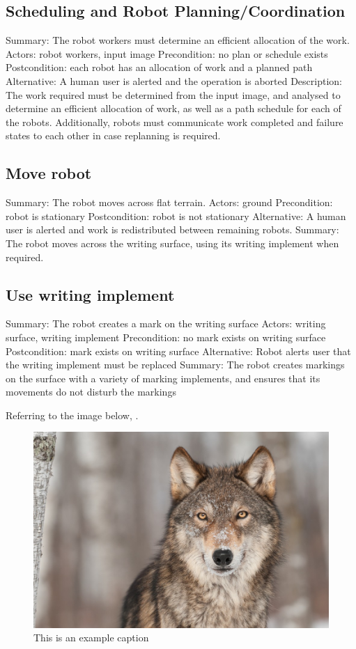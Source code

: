 \subsection{Scheduling and Robot Planning/Coordination}
Summary: The robot workers must determine an efficient allocation of the work.
Actors: robot workers, input image
Precondition: no plan or schedule exists
Postcondition: each robot has an allocation of work and a planned path
Alternative: A human user is alerted and the operation is aborted
Description: The work required must be determined from the input image, and analysed to determine an
efficient allocation of work, as well as a path schedule for each of the robots. Additionally,
robots must communicate work completed and failure states to each other in case replanning is required.

\subsection{Move robot}
Summary: The robot moves across flat terrain.
Actors: ground
Precondition: robot is stationary
Postcondition: robot is not stationary
Alternative: A human user is alerted and work is redistributed between remaining robots.
Summary: The robot moves across the writing surface, using its writing implement when required.

\subsection{Use writing implement}
Summary: The robot creates a mark on the writing surface
Actors: writing surface, writing implement
Precondition: no mark exists on writing surface
Postcondition: mark exists on writing surface
Alternative: Robot alerts user that the writing implement must be replaced
Summary: The robot creates markings on the surface with a variety of marking implements, and ensures
that its movements do not disturb the markings

Referring to the image below, .


\begin{figure}
 \centering
 \includegraphics[width=0.5\columnwidth]{figs/example_picture.jpg}
 \caption{This is an example caption}
 \label{fig:example_figure}
\end{figure}


